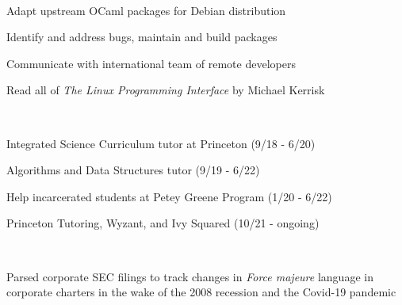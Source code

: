 \documentclass[a4paper]{MagicalCV}
\begin{document}
\begin{minipage}[t]{0.66\textwidth} 



 \\
\vspace{\topsep} %
\begin{tightemize}
\item Adapt upstream OCaml packages for Debian distribution
\item Identify and address bugs, maintain and build packages
\item Communicate with international team of remote developers
\item Read all of \textit{The Linux Programming Interface} by Michael Kerrisk
\end{tightemize}
\sectionsep

 \\
\vspace{\topsep} %
\begin{tightemize}
\item Integrated Science Curriculum tutor at Princeton (9/18 - 6/20)
\item Algorithms and Data Structures tutor (9/19 - 6/22)
\item Help incarcerated students at Petey Greene Program (1/20 - 6/22)
\item Princeton Tutoring, Wyzant, and Ivy Squared (10/21 - ongoing)
\end{tightemize}
\sectionsep

 \\
\vspace{\topsep} %
\begin{tightemize}
\item Parsed corporate SEC filings to track changes in \textit{Force majeure} language in corporate charters in the wake of the 2008 recession and the Covid-19 pandemic
\end{tightemize}
\sectionsep


\end{minipage}
\end{document}
